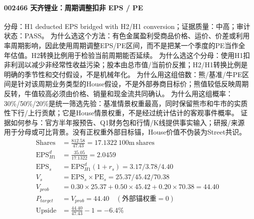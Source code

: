 \paragraph{002466 天齐锂业：周期调整扣非 EPS / PE}
分母：H1 deducted EPS bridged with H2/H1 conversion；证据质量：中高；审计状态：PASS。
为什么选这个方法：有色金属盈利受商品价格、运价、价差或利用率周期影响，因此使用周期调整EPS/PE区间，而不是把某一个季度的PE当作全年估值。H2转换比例用于检验当前周期能否延续。
为什么选这个分母：使用H1扣非利润以减少非经常性收益污染；股本由总市值/当前价反推；H2/H1转换比例是明确的季节性和交付假设，不是机械年化。
为什么用这组倍数：熊/基准/牛PE区间是针对该周期业务类型的House假设，不是外部券商目标价；熊值较低反映周期反转，牛值较高必须由价格、销量和现金流共同确认。
为什么用这组概率：30\%/50\%/20\%是统一筛选先验：基准情景权重最高，同时保留熊市和牛市的实质性下行/上行贡献；它是House情景权重，不是经过统计估计的客观事件概率。
证据如何参与：官方半年报预告、Q1财务包和行情/K线提供事实输入；研报/来源用于分母或可比背景。没有正权重外部目标锚，House价值不伪装为Street共识。
\begin{align*}
\mathrm{Shares} &= \frac{812.58}{47.43}=17.1322\ \mathrm{100m\ shares}\\
\mathrm{EPS}_{H1}^d &= \frac{35.05}{17.1322}=2.0459\\
\mathrm{EPS}_s &= \mathrm{EPS}_{H1}^d(1+r_s)=3.17/3.78/4.40\\
V_s &= \mathrm{EPS}_s\times \mathrm{PE}_s=25.37/45.42/70.38\\
V_{prob} &= 0.30\times 25.37+0.50\times 45.42+0.20\times 70.38=44.40\\
P_{target} &= V_{prob}=44.40\quad(\text{外部锚权重}=0)\\
\mathrm{Upside} &= \frac{44.40}{47.43}-1=-6.4\%\\
\end{align*}

